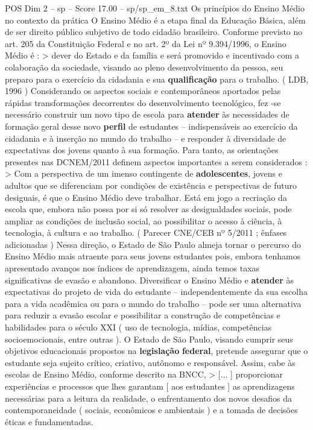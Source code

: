 \begin{textsample}{POS Dim 2 – sp – Score 17.00 – sp/sp\_em\_8.txt}  \label{ex:f2_pos_207}
Os princípios do Ensino Médio no contexto da prática O Ensino Médio é a etapa final da Educação Básica, além de ser direito público subjetivo de todo cidadão brasileiro.
Conforme previsto no art. 205 da Constituição Federal e no art. 2º da Lei nº 9.394/1996, o Ensino Médio é : > dever do Estado e da família e será promovido e incentivado com a colaboração da sociedade, visando ao pleno desenvolvimento da pessoa, seu preparo para o exercício da cidadania e sua \textbf{qualificação} para o trabalho. ( LDB, 1996 ) Considerando os aspectos sociais e contemporâneos aportados pelas rápidas transformações decorrentes do desenvolvimento tecnológico, fez -se necessário construir um novo tipo de escola para \textbf{atender} às necessidades de formação geral desse novo \textbf{perfil} de estudantes – indispensáveis ao exercício da cidadania e à inserção no mundo do trabalho – e responder à diversidade de expectativas dos jovens quanto à sua formação.
Para tanto, as orientações presentes nas DCNEM/2011 definem aspectos importantes a serem considerados : > Com a perspectiva de um imenso contingente de \textbf{adolescentes}, jovens e adultos que se diferenciam por condições de existência e perspectivas de futuro desiguais, é que o Ensino Médio deve trabalhar.
Está em jogo a recriação da escola que, embora não possa por si só resolver as desigualdades sociais, pode ampliar as condições de inclusão social, ao possibilitar o acesso à ciência, à tecnologia, à cultura e ao trabalho. ( Parecer CNE/CEB nº 5/2011 ; ênfases adicionadas ) Nessa direção, o Estado de São Paulo almeja tornar o percurso do Ensino Médio mais atraente para seus jovens estudantes pois, embora tenhamos apresentado avanços nos índices de aprendizagem, ainda temos taxas significativas de evasão e abandono.
Diversificar o Ensino Médio e \textbf{atender} às expectativas do projeto de vida do estudante – independentemente da sua escolha para a vida acadêmica ou para o mundo do trabalho – pode ser uma alternativa para reduzir a evasão escolar e possibilitar a construção de competências e habilidades para o século XXI ( uso de tecnologia, mídias, competências socioemocionais, entre outras ).
O Estado de São Paulo, visando cumprir seus objetivos educacionais propostos na \textbf{legislação} \textbf{federal}, pretende assegurar que o estudante seja sujeito crítico, criativo, autônomo e responsável.
Assim, cabe às escolas de Ensino Médio, conforme descrito na BNCC, > [... ] proporcionar experiências e processos que lhes garantam [ aos estudantes ] as aprendizagens necessárias para a leitura da realidade, o enfrentamento dos novos desafios da contemporaneidade ( sociais, econômicos e ambientais ) e a tomada de decisões éticas e fundamentadas.

\end{textsample}
